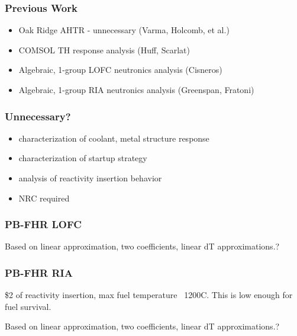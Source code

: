 \begin{frame}[fragile]
  \frametitle{Previous Work}
  \begin{itemize}
    \item Oak Ridge AHTR - unnecessary (Varma, Holcomb, et al.)
    \item COMSOL TH response analysis (Huff, Scarlat)
    \item Algebraic, 1-group LOFC neutronics analysis (Cisneros)
    \item Algebraic, 1-group RIA neutronics analysis (Greenspan, Fratoni)
  \end{itemize}

\end{frame}

\begin{frame}[fragile]
  \frametitle{Unnecessary?}
  \begin{itemize}
    \item characterization of coolant, metal structure response
    \item characterization of startup strategy
    \item analysis of reactivity insertion behavior
    \item NRC required
  \end{itemize}
\end{frame}

\begin{frame}[fragile]
  \frametitle{PB-FHR LOFC}
  Based on linear approximation, two coefficients, linear dT approximations.?
\end{frame}

\begin{frame}[fragile]
  \frametitle{PB-FHR RIA}
  \$2 of reactivity insertion, max fuel temperature ~1200C. This is low enough for fuel survival.

  Based on linear approximation, two coefficients, linear dT approximations.?
\end{frame}

